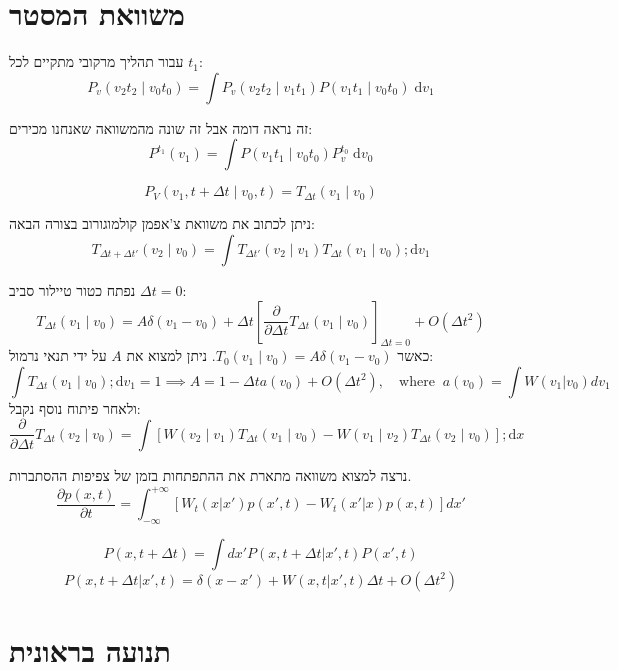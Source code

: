 \documentclass{tstextbook}
\begin{document}
\section{משוואת המסטר}

עבור תהליך מרקובי מתקיים לכל \(t_{1}\):
$$P_{v}(v_{2}t_{2}\mid  v_{0}t_{0})= \int P_{v}(v_{2}t_{2}\mid v_{1}t_{1})P(v_{1}t_{1}\mid v_{0}t_{0})\;\mathrm{d}v_{1}$$

\begin{remark}
זה נראה דומה אבל זה שונה מהמשוואה שאנחנו מכירים:
$$P^{t_{1}}(v_{1})=\int P(v_{1}t_{1}\mid v_{0}t_{0})P_{v}^{t_{0}} \;\mathrm{d}v_{0}$$

\end{remark}
\begin{definition}
$$P_{V}(v_{1},t+\Delta t\mid  v_{0},t)=T_{\Delta t}(v_{1}\mid v_{0})$$

\end{definition}
\begin{corollary}
ניתן לכתוב את משוואת צ'אפמן קולמוגורוב בצורה הבאה:
$$T_{\Delta t+\Delta t'}(v_{2}\mid v_{0})=\int T_{\Delta t'}(v_{2}\mid v_{1})T_{\Delta t}(v_{1}\mid v_{0}) ;\mathrm{d}v_{1}$$

\end{corollary}
נפתח כטור טיילור סביב \(\Delta t = 0\):
$$T_{\Delta t}(v_{1}\mid v_{0})=A\delta(v_{1}-v_{0})+\Delta t\left[ \frac{\partial}{\partial \Delta t} T_{\Delta t}(v_{1}\mid v_{0})\right]_{\Delta t=0} +O(\Delta t^{2})$$
כאשר \(T_{0}(v_{1}\mid v_{0})=A\delta(v_{1}-v_{0})\). ניתן למצוא את \(A\) על ידי תנאי נרמול:
$$\int T_{\Delta t}\left( v_{1}\mid v_{0} \right) ;\mathrm{d}v_{1}=1\implies A=1-\Delta t a (v_{0})+O\left( \Delta t^{2} \right), \quad \text{where}\;\;  a(v_0) = \int W(v_1 | v_0) dv_1$$
ולאחר פיתוח נוסף נקבל:
$$\frac{\partial }{\partial \Delta t} T_{\Delta t}(v_{2}\mid v_{0})=\int [W(v_{2}\mid v_{1})T_{\Delta t}(v_{1}\mid v_{0})-W(v_{1}\mid v_{2})T_{\Delta t}(v_{2}\mid v_{0})] ;\mathrm{d}x$$

נרצה למצוא משוואה מתארת את ההתפתחות בזמן של צפיפות ההסתברות.
$$\frac{\partial p(x, t)}{\partial t} = \int_{-\infty}^{+\infty} [W_t (x|x' )p(x', t) - W_t (x'|x)p(x, t)] dx'$$

$$P(x, t+\Delta t) = \int dx' P(x, t+\Delta t | x', t) P(x', t)$$$$P(x, t+\Delta t | x', t) = \delta(x-x') + W(x, t | x', t)\Delta t + O(\Delta t^2)$$

\section{תנועה בראונית}
\end{document}

